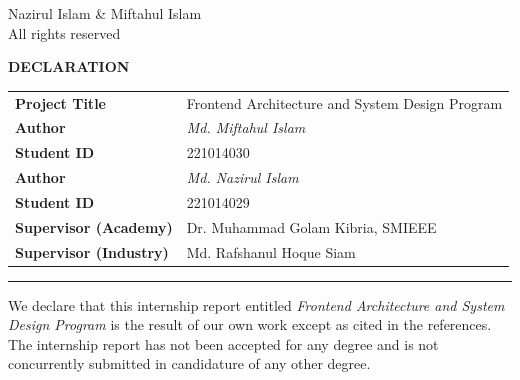 \documentclass[12pt, oneside, a4paper]{book}
\begin{document}
\restoregeometry

\newpage
\thispagestyle{empty}

\vspace*{\fill}
\begin{center}
\textcopyright{} Nazirul Islam \& Miftahul Islam \\[0.5cm]
All rights reserved
\end{center}
\vspace*{\fill}

\newpage
\thispagestyle{empty}

\begin{center}
{\large \textbf{DECLARATION}}

\vspace{2.0cm}

\begin{tabular}{>{\bfseries}p{} p{}}
  Project Title          & Frontend Architecture and System Design Program \\[4pt]
  Author                 & \textit{Md. Miftahul Islam}                     \\[2pt]
  Student ID             & 221014030                                       \\[4pt]
  Author                 & \textit{Md. Nazirul Islam}                      \\[2pt]
  Student ID             & 221014029                                       \\[4pt]
  Supervisor (Academy)   & Dr. Muhammad Golam Kibria, SMIEEE               \\[2pt]
  Supervisor (Industry)  & Md. Rafshanul Hoque Siam                        \\
\end{tabular}

\vspace{0.25cm}
\hrule
\vspace{1.2cm}

\justifying
We declare that this internship report entitled
\textit{Frontend Architecture and System Design Program}
is the result of our own work except as cited in the references.
The internship report has not been accepted for any degree and is not
concurrently submitted in candidature of any other degree.

\vspace{2.5cm}


\end{center}
\end{document}
